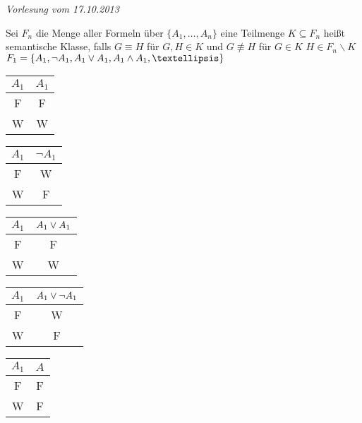
\begin{flushright} 
\textit{Vorlesung vom 17.10.2013}
\end{flushright}

Sei $F_n$ die Menge aller Formeln über $\{A_1, …, A_n\}$ eine Teilmenge $K \subseteq F_n$ heißt semantische Klasse, falls $G \equiv H$ für $G, H \in K$ und $G \not\equiv H$ für $G\in K$ \hspace{.5cm} $H \in F_n \backslash K$\\

\beispiel{}
$F_1 = \{A_1, \neg A_1, A_1 \OR A_1, A_1 \AND A_1, … \}$\\

\begin{minipage}{0.15\textwidth}
\begin{tabular}{c|c}
$A_1$ & $A_1$\\
\hline
F & F\\
W & W\\
\end{tabular}
\end{minipage}
\hfill
\begin{minipage}{0.15\textwidth}
\begin{tabular}{c|c}
$A_1$ & $\neg A_1$ \\
\hline
F & W\\
W & F\\
\end{tabular}
\end{minipage}
\hfill
\begin{minipage}{0.15\textwidth}
\begin{tabular}{c|c}
$A_1$ & $A_1 \vee A_1$\\
\hline
F & F\\
W & W\\
\end{tabular}
\end{minipage}
\hfill
\begin{minipage}{0.15\textwidth}
\begin{tabular}{c|c}
$A_1$ & $A_1 \vee \neg A_1$\\
\hline
F & W\\
W & F\\
\end{tabular}
\end{minipage}
\hfill
\begin{minipage}{0.15\textwidth}
\begin{tabular}{c|c}
$A_1$ & $A$\\
\hline
F & F\\
W & F\\
\end{tabular}
\end{minipage}\\

